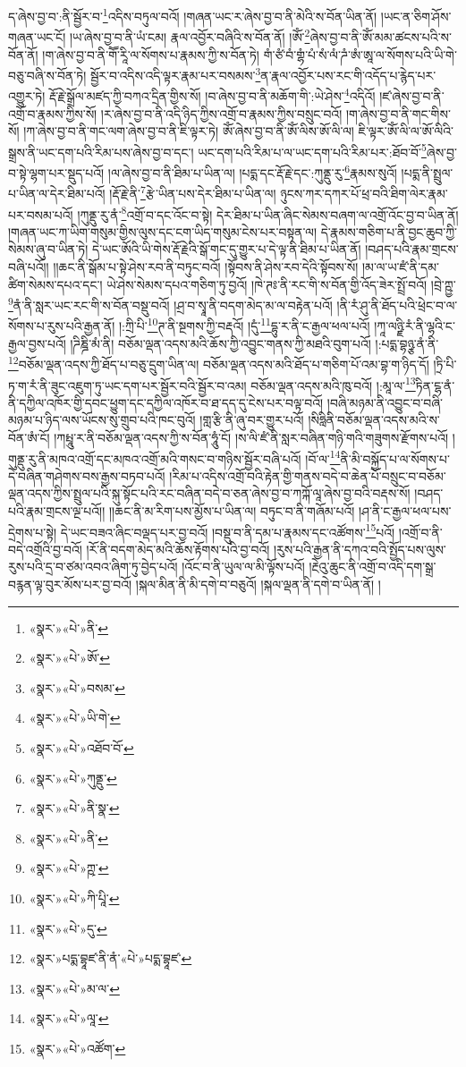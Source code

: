 ད་ཞེས་བྱ་བ་:ནི་སྦྱོར་བ་\footnote{«སྣར་»«པེ་»ནི་}འདིས་བཏུལ་བའོ། །གཞན་ཡང་ར་ཞེས་བྱ་བ་ནི་མེའི་ས་བོན་ཡིན་ནོ། །ཡང་ན་ཅིག་ཤོས་གཞན་ཡང་ངོ། །ཡ་ཞེས་བྱ་བ་ནི་ཡཾ་ངམ། རྣལ་འབྱོར་བཞིའི་ས་བོན་ནོ། །ཨོཾ་\footnote{«སྣར་»«པེ་»ཨོ་}ཞེས་བྱ་བ་ནི་ཨོཾ་མམ་ཚངས་པའི་ས་བོན་ནོ། །ག་ཞེས་བྱ་བ་ནི་གཽ་རཱི་ལ་སོགས་པ་རྣམས་ཀྱི་ས་བོན་ཏེ། གཾ་ཙཾ་བཾ་གྷཾ་པཾ་སཾ་ལཾ་ཌཾ་ཨཾ་ཨཱ་ལ་སོགས་པའི་ཡི་གེ་བཅུ་བཞི་ས་བོན་ཏེ། སྦྱོར་བ་འདིས་འདི་ལྟར་རྣམ་པར་བསམས་\footnote{«སྣར་»«པེ་»བསམ་}ན་རྣལ་འབྱོར་པས་རང་གི་འདོད་པ་རྙེད་པར་འགྱུར་ཏེ། རྡོ་རྗེ་སྒྲོལ་མཛད་ཀྱི་བཀའ་དྲིན་གྱིས་སོ། །བ་ཞེས་བྱ་བ་ནི་མཆོག་གི་:ཡེ་ཤེས་\footnote{«སྣར་»«པེ་»ཡི་གེ་}འདིའོ། །ཛ་ཞེས་བྱ་བ་ནི་འགྲོ་བ་རྣམས་ཀྱིས་སོ། །ར་ཞེས་བྱ་བ་ནི་འདི་ཉིད་ཀྱིས་འགྲོ་བ་རྣམས་ཀྱིས་བསྲུང་བའོ། །ག་ཞེས་བྱ་བ་ནི་གང་གིས་སོ། །ཀ་ཞེས་བྱ་བ་ནི་གང་ལག་ཞེས་བྱ་བ་ནི་ཇི་ལྟར་ཏེ། ཨོཾ་ཞེས་བྱ་བ་ནི་ཨོཾ་ལིས་ཨོ་ལི་ལ། ཇི་ལྟར་ཨོཾ་ལི་ལ་ཨོ་ལིའི་སྒྲས་ནི་ཡང་དག་པའི་རིམ་པས་ཞེས་བྱ་བ་དང་། ཡང་དག་པའི་རིམ་པ་ལ་ཡང་དག་པའི་རིམ་པར་:ཐོབ་བོ་\footnote{«སྣར་»«པེ་»འཐོབ་བོ་}ཞེས་བྱ་བ་སྟེ་ལྷག་པར་སྡུད་པའོ། །ལ་ཞེས་བྱ་བ་ནི་ཐིམ་པ་ཡིན་ལ། །པདྨ་དང་རྡོ་རྗེ་དང་:ཀུནྡུ་རུ་\footnote{«སྣར་»«པེ་»ཀུནྡུ་}རྣམས་སུའོ། །པདྨ་ནི་སྤྲུལ་པ་ཡིན་ལ་དེར་ཐིམ་པའོ། །རྡོ་རྗེ་ནི་\footnote{«སྣར་»«པེ་»ནི་སྣ་}རྩེ་ཡིན་པས་དེར་ཐིམ་པ་ཡིན་ལ། ཉུངས་ཀར་དཀར་པོ་ཕྲ་བའི་ཐིག་ལེར་རྣམ་པར་བསམ་པའོ། །ཀུནྡུ་རུ་ནཾ་\footnote{«སྣར་»«པེ་»ནི་}འགྲོ་བ་དང་འོང་བ་སྟེ། དེར་ཐིམ་པ་ཡིན་ཞིང་སེམས་བཞག་ལ་འགྲོ་འོང་བྱ་བ་ཡིན་ནོ། །གཞན་ཡང་ཀ་ཡིག་གསུམ་གྱིས་ལུས་དང་ངག་ཡིད་གསུམ་ངེས་པར་བསྟན་ལ། དེ་རྣམས་གཅིག་པ་ནི་བྱང་ཆུབ་ཀྱི་སེམས་ཞུ་བ་ཡིན་ཏེ། དེ་ཡང་ཨོའི་ཡི་གེས་རྡོ་རྗེའི་སྒོ་གང་དུ་གྱུར་པ་དེ་ལྟ་ནི་ཐིམ་པ་ཡིན་ནོ། །བཤད་པའི་རྣམ་གྲངས་བཞི་པའོ།། །།ཆང་ནི་སྒོམ་པ་སྟེ་ཤེས་རབ་ནི་བཏུང་བའོ། །སྟོབས་ནི་ཤེས་རབ་དེའི་སྟོབས་སོ། །མ་ལ་ཡ་ཛཾ་ནི་དམ་ཚིག་སེམས་དཔའ་དང་། ཡེ་ཤེས་སེམས་དཔའ་གཅིག་ཏུ་བྱའོ། །ཁེ་ཊཿ་ནི་རང་གི་ས་བོན་གྱི་འོད་ཟེར་སྤྲོ་བའོ། །བྲེ་ཀྵྱ་\footnote{«སྣར་»«པེ་»ཀྵ་}ནཾ་ནི་སླར་ཡང་རང་གི་ས་བོན་བསྡུ་བའོ། །ཤྲ་བ་སྭཱ་ནི་བདག་མེད་མ་ལ་བརྟེན་པའོ། །ནི་རཾ་ཤུ་ནི་ཐོད་པའི་ཕྲེང་བ་ལ་སོགས་པ་རུས་པའི་རྒྱན་ནོ། །:ཀྲི་པི་\footnote{«སྣར་»«པེ་»ཀི་པཱི་}ཊ་ནི་སྔགས་ཀྱི་བརྡའོ། །དུཾ་\footnote{«སྣར་»«པེ་»དུ་}དྷུ་ར་ནི་ང་རྒྱལ་ཕལ་པའོ། །ཀཱ་ལཉྫི་རཾ་ནི་ལྷའི་ང་རྒྱལ་བྱས་པའོ། །ཌིཎྜི་མཾ་ནི། བཅོམ་ལྡན་འདས་མའི་ཆོས་ཀྱི་འབྱུང་གནས་ཀྱི་མཐའི་བུག་པའོ། །:པདྨ་བྷཉྩ་ནཾ་ནི་\footnote{«སྣར་»པདྨ་བྷཱཛ་ནི་ནཾ་«པེ་»པདྨ་བྷཱཛ་}བཅོམ་ལྡན་འདས་ཀྱི་ཐོད་པ་བཅུ་དྲུག་ཡིན་ལ། བཅོམ་ལྡན་འདས་མའི་ཐོད་པ་གཅིག་པོ་འམ་བྷ་ག་ཉིད་དོ། །ཏྲི་པི་ཏ་ག་རཾ་ནི་ཟུང་འཇུག་ཏུ་ཡང་དག་པར་སྦྱོར་བའི་སྦྱོར་བ་འམ། བཅོམ་ལྡན་འདས་མའི་ཁུ་བའོ། །:མཱ་ལ་\footnote{«སྣར་»«པེ་»མ་ལ་}ཏིན་ངྷ་ནཾ་ནི་དཀྱིལ་འཁོར་གྱི་དབང་ཕྱུག་དང་དཀྱིལ་འཁོར་བ་ཐ་དད་དུ་ངེས་པར་བལྟ་བའོ། །བཞི་མཉམ་ནི་འབྱུང་བ་བཞི་མཉམ་པ་ཉིད་ལས་ཡོངས་སུ་གྲུབ་པའི་ཁང་བུའོ། །གླ་རྩི་ནི་ཞུ་བར་གྱུར་པའོ། །སིཧླིནི་བཅོམ་ལྡན་འདས་མའི་ས་བོན་ཨཾ་ངོ། །ཀཔྤཱུ་ར་ནི་བཅོམ་ལྡན་འདས་ཀྱི་ས་བོན་ཧཱུཾ་ངོ། །ས་ལི་ཛཾ་ནི་སླར་བཞིན་གཉི་གའི་གཟུགས་རྫོགས་པའོ། །གུནྡུ་རུ་ནི་མཁའ་འགྲོ་དང་མཁའ་འགྲོ་མའི་གསང་བ་གཉིས་སྦྱོར་བཞི་པའོ། །བོ་ལ་\footnote{«སྣར་»«པེ་»ལཱ་}ནི་མི་བསྐྱོད་པ་ལ་སོགས་པ་དེ་བཞིན་གཤེགས་བས་རྒྱས་བཏབ་པའོ། །རིམ་པ་འདིས་འགྲོ་བའི་རྟེན་གྱི་གནས་བདེ་བ་ཆེན་པོ་བསྲུང་བ་བཅོམ་ལྡན་འདས་ཀྱིས་སྤྲུལ་པའི་སྐུ་སྟོང་པའི་རང་བཞིན་བདེ་བ་ཅན་ཞེས་བྱ་བ་ཀཀྐོ་ལཱ་ཞེས་བྱ་བའི་བརྡས་སོ། །བཤད་པའི་རྣམ་གྲངས་ལྔ་པའོ།། །།ཆང་ནི་མ་རིག་པས་མྱོས་པ་ཡིན་ལ། བཏུང་བ་ནི་གཞོམ་པའོ། །ཤ་ནི་ང་རྒྱལ་ཕལ་པས་དྲེགས་པ་སྟེ། དེ་ཡང་བཟའ་ཞིང་བལྡད་པར་བྱ་བའོ། །བསྡུ་བ་ནི་དམ་པ་རྣམས་དང་འཚོགས་\footnote{«སྣར་»«པེ་»འཚོག་}པའོ། །འགྲོ་བ་ནི་བདེ་འགྲོའི་བྱ་བའོ། །རོ་ནི་བདག་མེད་མའི་ཆོས་རྟོགས་པའི་བྱ་བའོ། །རུས་པའི་རྒྱན་ནི་དཀའ་བའི་སྤྱོད་པས་ལུས་རུས་པའི་དྲ་བ་ཙམ་འབའ་ཞིག་ཏུ་བྱེད་པའོ། །འོང་བ་ནི་ཡུལ་ལ་མི་ལྟོས་པའོ། །རྔེའུ་ཆུང་ནི་འགྲོ་བ་འདི་དག་སྒྲ་བརྙན་ལྟ་བུར་མོས་པར་བྱ་བའོ། །སྐལ་མིན་ནི་མི་དགེ་བ་བཅུའོ། །སྐལ་ལྡན་ནི་དགེ་བ་ཡིན་ནོ། །
